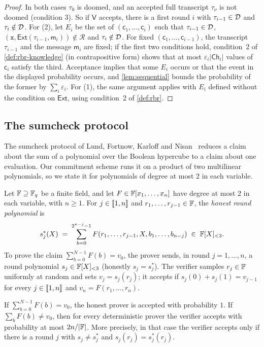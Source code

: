 \begin{proof}
In both cases $\tau_0$ is doomed, and an accepted full transcript $\tau_\nu$ is not doomed (condition 3).
So if $\mathsf{V}$ accepts, there is a first round $i$ with $\tau_{i-1} \in \mathcal{D}$ and $\tau_i \notin \mathcal{D}$.
For (2), let $E_i$ be the set of $(\mathsf{c}_1,\dots,\mathsf{c}_i)$ such that $\tau_{i-1} \in \mathcal{D}$, $(\mathtt{x}, \mathsf{Ext}(\tau_{i-1}, \mathsf{m}_i)) \notin \mathcal{R}$ and $\tau_i \notin \mathcal{D}$.
For fixed $(\mathsf{c}_1,\dots,\mathsf{c}_{i-1})$, the transcript $\tau_{i-1}$ and the message $\mathsf{m}_i$ are fixed; if the first two conditions hold, condition~2 of \cref{def:rbr-knowledge} (in contrapositive form) shows that at most $\varepsilon_i |\mathsf{Ch}_i|$ values of $\mathsf{c}_i$ satisfy the third.
Acceptance implies that some $E_i$ occurs or that the event in the displayed probability occurs, and \cref{lem:sequential} bounds the probability of the former by $\sum_i \varepsilon_i$.
For (1), the same argument applies with $E_i$ defined without the condition on $\mathsf{Ext}$, using condition~2 of \cref{def:rbr}.
\end{proof}

\subsection{The sumcheck protocol}\label{sec:proofs:sumcheck}

The sumcheck protocol of Lund, Fortnow, Karloff and Nisan~\cite{LFKN92} reduces a claim about the sum of a polynomial over the Boolean hypercube to a claim about one evaluation.
Our commitment scheme runs it on a product of two multilinear polynomials, so we state it for polynomials of degree at most $2$ in each variable.

Let $\mathbb{F} \supseteq \mathbb{F}_q$ be a finite field, and let $F \in \mathbb{F}[x_1,\dots,x_n]$ have degree at most $2$ in each variable, with $n \ge 1$.
For $j \in \llbracket 1, n \rrbracket$ and $r_1,\dots,r_{j-1} \in \mathbb{F}$, the \emph{honest round polynomial} is
\[
  s^*_j(X) \;=\; \sum_{b = 0}^{2^{n-j}-1} F(r_1,\dots,r_{j-1}, X, b_1,\dots,b_{n-j}) \;\in\; \mathbb{F}[X]_{<3}.
\]
To prove the claim $\sum_{b=0}^{N-1} F(b) = v_0$, the prover sends, in round $j = 1,\dots,n$, a round polynomial $s_j \in \mathbb{F}[X]_{<3}$ (honestly $s_j = s^*_j$).
The verifier samples $r_j \in \mathbb{F}$ uniformly at random and sets $v_j = s_j(r_j)$; it accepts if $s_j(0) + s_j(1) = v_{j-1}$ for every $j \in \llbracket 1, n \rrbracket$ and $v_n = F(r_1,\dots,r_n)$.

\begin{lemma}[Sumcheck]\label{lem:sumcheck}
If $\sum_{b=0}^{N-1} F(b) = v_0$, the honest prover is accepted with probability $1$.
If $\sum_{b} F(b) \ne v_0$, then for every deterministic prover the verifier accepts with probability at most $2n/|\mathbb{F}|$.
More precisely, in that case the verifier accepts only if there is a round $j$ with $s_j \ne s^*_j$ and $s_j(r_j) = s^*_j(r_j)$.
\end{lemma}

